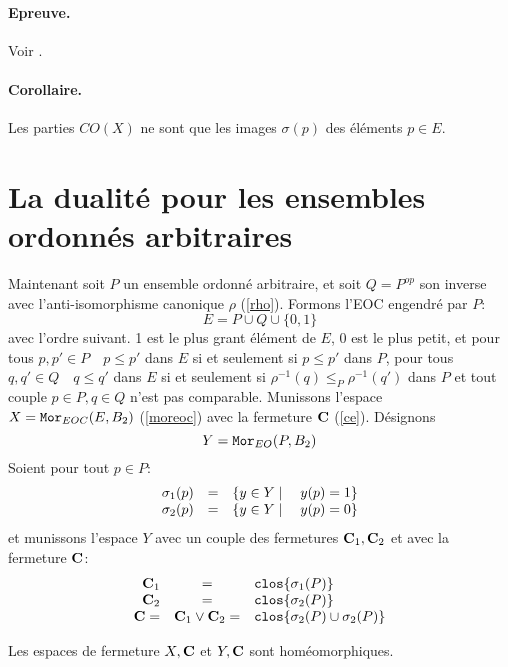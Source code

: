 \paragraph{Epreuve.} Voir \cite{mayet}. \endproof 
\paragraph{Corollaire.} Les parties $CO(X)$ ne sont que les images 
$\sigma(p)$ des \'el\'ements $p\in E$. 

\section{La dualit\'e pour les ensembles ordonn\'es arbitraires} 

Maintenant soit $P$ un ensemble ordonn\'e arbitraire, et soit 
$Q=P^{op}$ son inverse avec l'anti-iso\-mor\-phisme canonique 
$\rho$ (\ref{rho}).  Formons l'EOC engendr\'e par $P$:  
\begin{equation} 
E=P\cup Q\cup\{0,1\} \label{eee} 
\end{equation} 
avec l'ordre suivant. 1 est le plus grant \'el\'ement de $E$, 
0 est le plus petit, et pour tous $p,p'\in P\quad  p\le p'$ dans 
$E$ si et seulement si $p\le p'$ dans $P$, pour tous $q,q'\in 
Q\quad  q\le q'$ dans $E$ si et seulement si 
$\rho^{-1}(q)\le_P\rho^{-1}(q')$ dans $P$ et tout couple 
$p\in P, q\in Q$ n'est pas comparable. Munissons l'espace 
$X={\tt Mor}_{EOC}(E,B_2)$ (\ref{moreoc}) avec la fermeture ${\bf C}$ 
(\ref{ce}).  D\'esignons 
\[ Y={\tt Mor}_{EO}(P,B_2) \] 
Soient pour tout $p\in P$: 
\begin{equation} 
\begin{array}{rcl}
\sigma_1(p)&=&\{y\in Y\mid\quad y(p)=1\}\cr 
\sigma_2(p)&=&\{y\in Y\mid\quad y(p)=0\} 
\end{array} \label{s12} 
\end{equation} 
et munissons l'espace $Y$ avec un couple 
des fermetures ${\bf C}_1,{\bf C}_2$ et avec la fermeture ${\bf C}$: 
\begin{equation} 
\begin{array}{rcl}
{\bf C}_1&=&{\tt clos}\{\sigma_1(P)\}\cr 
{\bf C}_2&=&{\tt clos}\{\sigma_2(P)\}\cr 
{\bf C}=&{\bf C}_1\lor{\bf C}_2=&{\tt clos}\{\sigma_2(P)\cup\sigma_2(P)\}
\end{array} \label{c12} 
\end{equation} 

\begin{lemma} Les espaces de fermeture $X,{\bf C}$ et $Y,{\bf C}$ sont 
hom\-\'e\-o\-mor\-phi\-ques. 
\end{lemma} 
